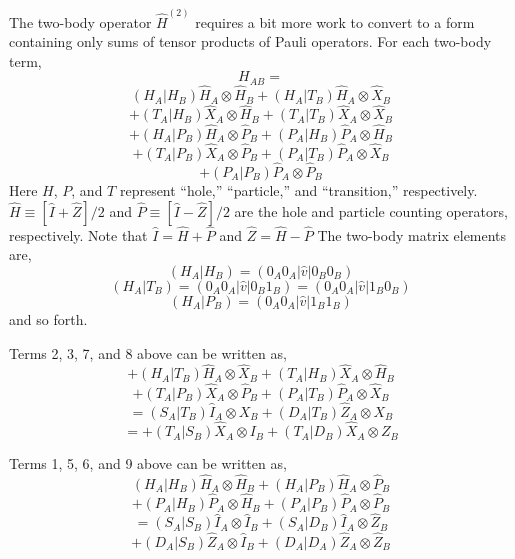The two-body operator $\hat H^{(2)}$ requires a bit more work to convert to a
form containing only sums of tensor products of Pauli operators. For each
two-body term,
\begin{equation}
H_{AB}
=
\end{equation}
\[
  (H_A | H_B) \hat H_A \otimes \hat H_B
+ (H_A | T_B) \hat H_A \otimes \hat X_B
\]
\[
+ (T_A | H_B) \hat X_A \otimes \hat H_B
+ (T_A | T_B) \hat X_A \otimes \hat X_B
\]
\[
+ (H_A | P_B) \hat H_A \otimes \hat P_B
+ (P_A | H_B) \hat P_A \otimes \hat H_B
\]
\[
+ (T_A | P_B) \hat X_A \otimes \hat P_B
+ (P_A | T_B) \hat P_A \otimes \hat X_B
\]
\[
+ (P_A | P_B) \hat P_A \otimes \hat P_B
\]
Here $H$, $P$, and $T$ represent ``hole,'' ``particle,'' and ``transition,''
respectively. $\hat H \equiv [\hat I + \hat Z] / 2$ and $\hat P \equiv [\hat I
- \hat Z] / 2$ are the hole and particle counting operators, respectively. Note
  that $\hat I = \hat H + \hat P$ and $\hat Z = \hat H - \hat P$ The two-body
matrix elements are,
\begin{equation}
(H_A | H_B) 
=
(0_A 0_A | \hat v | 0_B 0_B)
\end{equation}
\begin{equation}
(H_A | T_B) 
=
(0_A 0_A | \hat v | 0_B 1_B)
=
(0_A 0_A | \hat v | 1_B 0_B)
\end{equation}
\begin{equation}
(H_A | P_B)
=
(0_A 0_A | \hat v | 1_B 1_B)
\end{equation}
and so forth.

Terms 2, 3, 7, and 8 above can be written as,
\begin{equation}
+ (H_A | T_B) \hat H_A \otimes \hat X_B
+ (T_A | H_B) \hat X_A \otimes \hat H_B
\end{equation}
\[
+ (T_A | P_B) \hat X_A \otimes \hat P_B
+ (P_A | T_B) \hat P_A \otimes \hat X_B
\]
\[
=
  (S_A | T_B) \hat I_A \otimes X_B
+ (D_A | T_B) \hat Z_A \otimes X_B
\]
\[
=
+ (T_A | S_B) \hat X_A \otimes I_B
+ (T_A | D_B) \hat X_A \otimes Z_B
\]

Terms 1, 5, 6, and 9 above can be written as,
\begin{equation}
  (H_A | H_B) \hat H_A \otimes \hat H_B
+ (H_A | P_B) \hat H_A \otimes \hat P_B
\end{equation}
\[
+ (P_A | H_B) \hat P_A \otimes \hat H_B
+ (P_A | P_B) \hat P_A \otimes \hat P_B
\]
\[
=
  (S_A | S_B) \hat I_A \otimes \hat I_B
+ (S_A | D_B) \hat I_A \otimes \hat Z_B
\]
\[
+ (D_A | S_B) \hat Z_A \otimes \hat I_B
+ (D_A | D_A) \hat Z_A \otimes \hat Z_B
\]


